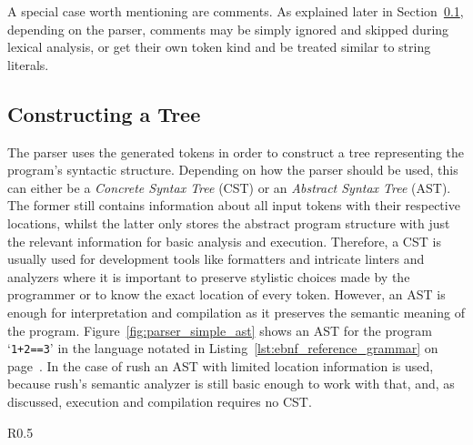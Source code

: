A special case worth mentioning are comments.
As explained later in Section~\ref{sec:constructing_a_tree}, depending on the parser, comments may be simply ignored and skipped during lexical analysis, or get their own token kind and be treated similar to string literals.


\subsection{Constructing a Tree}\label{sec:constructing_a_tree}

The parser uses the generated tokens in order to construct a tree representing the program's syntactic structure.
Depending on how the parser should be used, this can either be a \emph{Concrete Syntax Tree} (CST) or an \emph{Abstract Syntax Tree} (AST).
The former still contains information about all input tokens with their respective locations, whilst the latter only stores the abstract program structure with just the relevant information for basic analysis and execution.
Therefore, a CST is usually used for development tools like formatters and intricate linters and analyzers where it is important to preserve stylistic choices made by the programmer or to know the exact location of every token.
However, an AST is enough for interpretation and compilation as it preserves the semantic meaning of the program.
Figure~\ref{fig:parser_simple_ast} shows an AST for the program `\Verb|1+2==3|' in the language notated in Listing~\ref{lst:ebnf_reference_grammar} on page~\pageref{lst:ebnf_reference_grammar}.
In the case of rush an AST with limited location information is used, because rush's semantic analyzer is still basic enough to work with that, and, as discussed, execution and compilation requires no CST.

\begin{wrapfigure}{R}{0.5\textwidth}
    \centering
    \caption{Abstract Syntax Tree for `\texttt{1+2==3}'}\label{fig:parser_simple_ast}
\end{wrapfigure}

